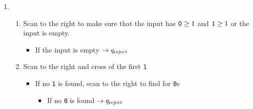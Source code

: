 \documentclass[11pt]{article}
\begin{document}
\begin{enumerate}
{\begin{enumerate}
\begin{enumerate}
        \item Scan to the right to make sure that the input has ${\tt 0} \ge 1$ and ${\tt 1} \ge 1$ or the input is empty. 
        \begin{itemize}
            \item If the input is empty $\to \qacc$
        \end{itemize}
        \item Scan to the right and cross of the first {\tt 1}
        \begin{itemize}
            \item If no {\tt 1} is found, scan to the right to find for {\tt 0}s
            \begin{itemize}
                \item If no {\tt 0} is found $\to \qacc$
                \item If a {\tt 0} has been found $\to \qrej$
            \end{itemize}
        \end{itemize}
        \item Rewind to the left and scan to the right to cross off first 2 {\tt 0}s
        \begin{itemize}
            \item If no {\tt 0} has been found $\to \qrej$
            \item If only one {\tt 0} has been found $\to \qrej$
        \end{itemize}
        \item Rewind to the left and repeat step ii. 
    \end{enumerate}
    \item
    \begin{enumerate}
        \item Scan to the right to make sure that the input has ${\tt 0} \ge 1$ and ${\tt 1} \ge 1$ or the input is empty. 
        \begin{itemize}
            \item If the input is empty $\to \qrej$
        \end{itemize}
        \item Scan to the right and cross of the first {\tt 1}
        \begin{itemize}
            \item If no {\tt 1} is found, scan to the right to find for {\tt 0}s
            \begin{itemize}
                \item If no {\tt 0} is found $\to \qrej$

\end{itemize}
\end{itemize}
\end{enumerate}
\end{enumerate}}
\end{enumerate}
\end{document}
